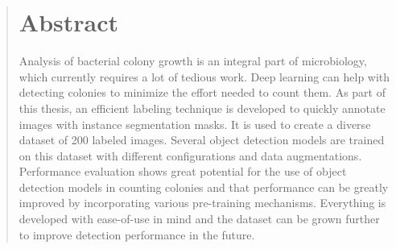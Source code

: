 \begin{abstract}
\section*{Abstract}

Analysis of bacterial colony growth is an integral part of microbiology, which currently requires a lot of tedious work. Deep learning can help with detecting colonies to minimize the effort needed to count them. As part of this thesis, an efficient labeling technique is developed to quickly annotate images with instance segmentation masks. It is used to create a diverse dataset of 200 labeled images. Several object detection models are trained on this dataset with different configurations and data augmentations. Performance evaluation shows great potential for the use of object detection models in counting colonies and that performance can be greatly improved by incorporating various pre-training mechanisms. Everything is developed with ease-of-use in mind and the dataset can be grown further to improve detection performance in the future.

\end{abstract}
